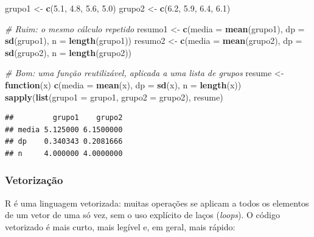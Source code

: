 \documentclass[
]{book}
\newenvironment{Shaded}{\begin{snugshade}}{\end{snugshade}}
\newcommand{\AttributeTok}[1]{\textcolor[rgb]{0.13,0.29,0.53}{#1}}
\newcommand{\CommentTok}[1]{\textcolor[rgb]{0.56,0.35,0.01}{\textit{#1}}}
\newcommand{\ControlFlowTok}[1]{\textcolor[rgb]{0.13,0.29,0.53}{\textbf{#1}}}
\newcommand{\FloatTok}[1]{\textcolor[rgb]{0.00,0.00,0.81}{#1}}
\newcommand{\FunctionTok}[1]{\textcolor[rgb]{0.13,0.29,0.53}{\textbf{#1}}}
\newcommand{\NormalTok}[1]{#1}
\newcommand{\OtherTok}[1]{\textcolor[rgb]{0.56,0.35,0.01}{#1}}
\begin{document}
\begin{Shaded}
\begin{Highlighting}[]
\NormalTok{grupo1 }\OtherTok{\textless{}{-}} \FunctionTok{c}\NormalTok{(}\FloatTok{5.1}\NormalTok{, }\FloatTok{4.8}\NormalTok{, }\FloatTok{5.6}\NormalTok{, }\FloatTok{5.0}\NormalTok{)}
\NormalTok{grupo2 }\OtherTok{\textless{}{-}} \FunctionTok{c}\NormalTok{(}\FloatTok{6.2}\NormalTok{, }\FloatTok{5.9}\NormalTok{, }\FloatTok{6.4}\NormalTok{, }\FloatTok{6.1}\NormalTok{)}

\CommentTok{\# Ruim: o mesmo cálculo repetido}
\NormalTok{resumo1 }\OtherTok{\textless{}{-}} \FunctionTok{c}\NormalTok{(}\AttributeTok{media =} \FunctionTok{mean}\NormalTok{(grupo1), }\AttributeTok{dp =} \FunctionTok{sd}\NormalTok{(grupo1), }\AttributeTok{n =} \FunctionTok{length}\NormalTok{(grupo1))}
\NormalTok{resumo2 }\OtherTok{\textless{}{-}} \FunctionTok{c}\NormalTok{(}\AttributeTok{media =} \FunctionTok{mean}\NormalTok{(grupo2), }\AttributeTok{dp =} \FunctionTok{sd}\NormalTok{(grupo2), }\AttributeTok{n =} \FunctionTok{length}\NormalTok{(grupo2))}

\CommentTok{\# Bom: uma função reutilizável, aplicada a uma lista de grupos}
\NormalTok{resume }\OtherTok{\textless{}{-}} \ControlFlowTok{function}\NormalTok{(x) }\FunctionTok{c}\NormalTok{(}\AttributeTok{media =} \FunctionTok{mean}\NormalTok{(x), }\AttributeTok{dp =} \FunctionTok{sd}\NormalTok{(x), }\AttributeTok{n =} \FunctionTok{length}\NormalTok{(x))}
\FunctionTok{sapply}\NormalTok{(}\FunctionTok{list}\NormalTok{(}\AttributeTok{grupo1 =}\NormalTok{ grupo1, }\AttributeTok{grupo2 =}\NormalTok{ grupo2), resume)}
\end{Highlighting}
\end{Shaded}

\begin{verbatim}
##         grupo1    grupo2
## media 5.125000 6.1500000
## dp    0.340343 0.2081666
## n     4.000000 4.0000000
\end{verbatim}

\subsubsection{Vetorização}\label{vetorizauxe7uxe3o}

R é uma linguagem vetorizada: muitas operações se aplicam a todos os elementos de um vetor de uma só vez, sem o uso explícito de laços (\emph{loops}). O código vetorizado é mais curto, mais legível e, em geral, mais rápido:
\end{document}
